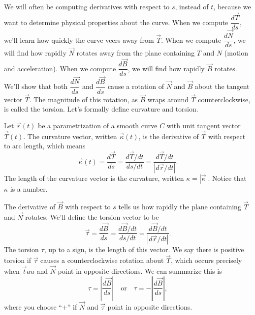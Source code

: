 
We will often be computing derivatives with respect to $s$, instead of $t$, because we want to determine physical properties about the curve. When we compute $\dfrac{d\vec T}{ds}$, we'll learn how quickly the curve veers away from $\vec T$.  
When we compute $\dfrac{d\vec N}{ds}$, we will find how rapidly $\vec N$ rotates away from the plane containing $T$ and $N$ (motion and acceleration). 
When we compute $\dfrac{d\vec B}{ds}$, we will find how rapidly $\vec B$ rotates.  We'll show that both $\dfrac{d\vec N}{ds}$ and $\dfrac{d\vec B}{ds}$ cause a rotation of $\vec N$ and $\vec B$ about the tangent vector $\vec T$. The magnitude of this rotation, as $\vec B$ wraps around $\vec T$ counterclockwise, is called the torsion. Let's formally define curvature and torsion.

\begin{definition}
 Let $\vec r(t)$ be a parametrization of a smooth curve $C$ with unit tangent vector $\vec T(t)$.  The curvature vector, written $\vec \kappa(t)$, is the derivative of $\vec T$ with respect to arc length, which means 
 $$\vec \kappa(t)=\dfrac{d\vec T}{ds}=\dfrac{d\vec T/dt}{ds/dt}=\dfrac{d\vec T/dt}{|d\vec r/dt|}.$$ 
 The length of the curvature vector is the curvature, written $\kappa = |\vec\kappa|$. Notice that $\kappa$ is a number.

 The derivative of $\vec B$ with respect to $s$ tells us how rapidly the plane containing $\vec T$ and $\vec N$ rotates. We'll define the torsion vector to be 
%
 $$\vec \tau = \dfrac{d\vec B}{ds} = \dfrac{d\vec B/dt}{ds/dt}=\dfrac{d\vec B/dt}{|d\vec r/dt|}.$$ 
 The torsion $\tau$, up to a sign, is the length of this vector. We say there is positive torsion if $\vec \tau$ causes a counterclockwise rotation about $\vec T$, which occurs precisely when $\vec tau$ and $\vec N$ point in opposite directions. We can summarize this is $$\tau=\left|\dfrac{d\vec B}{ds}\right|\quad \text{or}\quad \tau=-\left|\dfrac{d\vec B}{ds}\right|,$$ where you choose ``$+$'' if $\vec N$ and $\vec \tau$ point in opposite directions. 
\end{definition}



